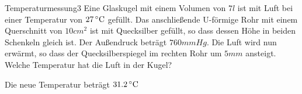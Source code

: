


\begin{problem}{Temperaturmessung}{3}
Eine Glaskugel mit einem Volumen von $7\unit{l}$ ist mit Luft bei einer Temperatur
von $27\,\mathrm{^\circ C}$ gefüllt. Das anschließende U-förmige Rohr mit einem Querschnitt von $10\unit{cm^2}$
ist mit Quecksilber gefüllt, so dass dessen Höhe in beiden Schenkeln gleich ist. Der Außendruck
beträgt $760\unit{mmHg}$. Die Luft wird nun erwärmt, so dass der Quecksilberspiegel im rechten Rohr
um $5\unit{mm}$ ansteigt.\\
Welche Temperatur hat die Luft in der Kugel?
\begin{solution}
Die neue Temperatur beträgt $31.2\,\mathrm{^\circ C}$
\end{solution}
\end{problem}


